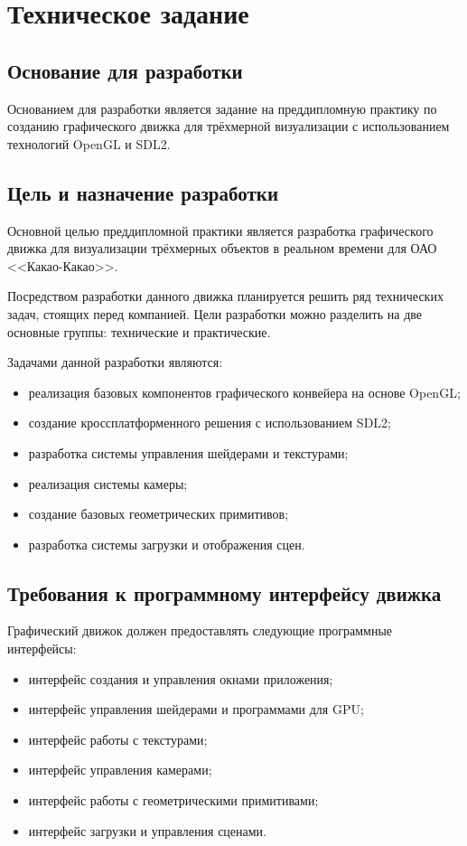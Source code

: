 \section{Техническое задание}
\subsection{Основание для разработки}

Основанием для разработки является задание на преддипломную практику по созданию графического движка для трёхмерной визуализации с использованием технологий OpenGL и SDL2.

\subsection{Цель и назначение разработки}

Основной целью преддипломной практики является разработка графического движка для визуализации трёхмерных объектов в реальном времени для ОАО <<Какао-Какао>>.

Посредством разработки данного движка планируется решить ряд технических задач, стоящих перед компанией. Цели разработки можно разделить на две основные группы: технические и практические.

Задачами данной разработки являются:
\begin{itemize}
\item реализация базовых компонентов графического конвейера на основе OpenGL;
\item создание кроссплатформенного решения с использованием SDL2;
\item разработка системы управления шейдерами и текстурами;
\item реализация системы камеры;
\item создание базовых геометрических примитивов;
\item разработка системы загрузки и отображения сцен.
\end{itemize}

\subsection{Требования к программному интерфейсу движка}

Графический движок должен предоставлять следующие программные интерфейсы:
\begin{itemize}
    \item интерфейс создания и управления окнами приложения;
    \item интерфейс управления шейдерами и программами для GPU;
    \item интерфейс работы с текстурами;
    \item интерфейс управления камерами;
    \item интерфейс работы с геометрическими примитивами;
    \item интерфейс загрузки и управления сценами.
\end{itemize}

